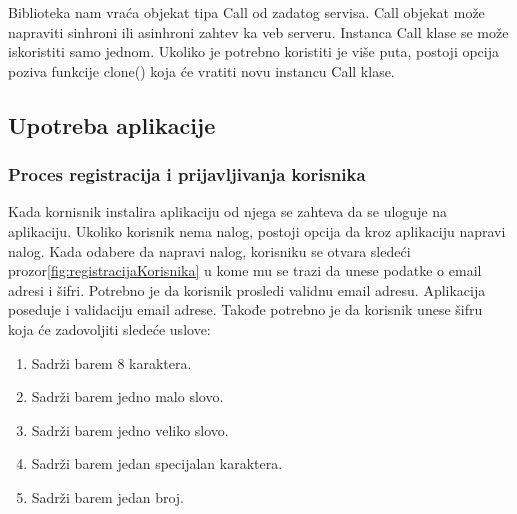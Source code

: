 \documentclass[12pt,oneside]{memoir}
\begin{document}
Biblioteka nam vraća objekat tipa Call od zadatog servisa. Call objekat može napraviti sinhroni ili asinhroni zahtev ka veb serveru. Instanca Call klase se može iskoristiti samo jednom. Ukoliko je potrebno koristiti je više puta, postoji opcija poziva funkcije clone() koja će vratiti novu instancu Call klase.
 
\subsection{Upotreba aplikacije}
 
\subsubsection{Proces registracija i prijavljivanja korisnika}
 
Kada kornisnik instalira aplikaciju od njega se zahteva da se uloguje na aplikaciju. Ukoliko korisnik nema nalog, postoji opcija da kroz aplikaciju napravi nalog. Kada odabere da napravi nalog, korisniku se otvara sledeći prozor\ref{fig:registracijaKorisnika} u kome mu se trazi da unese podatke o email adresi i šifri. Potrebno je da korisnik prosledi validnu email adresu. Aplikacija poseduje i validaciju email adrese. Takođe potrebno je da korisnik unese šifru koja će zadovoljiti sledeće uslove:

\begin{enumerate}
  \item Sadrži barem 8 karaktera.
  \item Sadrži barem jedno malo slovo.
  \item Sadrži barem jedno veliko slovo.
  \item Sadrži barem jedan specijalan karaktera.
  \item Sadrži barem jedan broj.
\end{enumerate}
 
\end{document}
